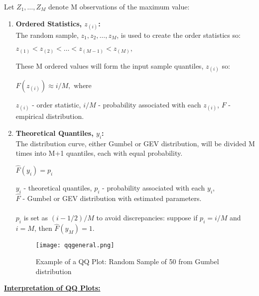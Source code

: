 \documentclass{article}
\begin{document}
Let $Z_1,\ldots, Z_M$ denote M observations of the maximum value:\vspace{-0.2cm}
\begin{enumerate}
  \item \textbf{Ordered Statistics, $z_{(i)}$:} \\ The random sample, ${z_1, z_2,\ldots, z_M}$, is used to create the order statistics so: 
  \vspace*{-3mm}
  \begin{flushleft}
   $z_{(1)} < z_{(2)} <\ldots< z_{(M-1)} < z_{(M)},$ 
  \end{flushleft}
    \vspace*{-3mm}
   These M ordered values will form the input sample quantiles, $z_{(i)}$ so:
   \vspace*{-3mm}
   \begin{center}
   $F(z_{(i)}) \approx i/M, \text{ where}$
   \end{center}
   \vspace*{-3mm}
  $z_{(i)}$ - order statistic, 
  $i/M$ - probability associated with each $z_{(i)}$,
  $F$ - empirical distribution.

  \item \textbf{Theoretical Quantiles, $y_i$:} \\ The distribution curve, either Gumbel or GEV distribution, will be divided M times into M+1 quantiles, each with equal probability.
  \vspace*{-3mm}
  \begin{center}
  $\hat{F}$$(y_i) = p_i$ 
  \end{center} 
  \vspace*{-3mm}
  $y_i$ - theoretical quantiles, 
  $p_i$ - probability associated with each $y_i$, \\
  $\hat{F}$ - Gumbel or GEV distribution with estimated parameters. \\
 \\ $p_i$ is set as $(i-1/2)/M$ to avoid discrepancies: suppose if $p_i = i/M$ and $i = M$, then $\hat{F}$$(y_M) = 1$.
  
   \begin{figure}[h]
    \centering
    \texttt{[image: qqgeneral.png]}
  \vspace*{-5mm} 
  \caption{Example of a QQ Plot: Random Sample of 50 from Gumbel distribution}
  \label{qqplotexample}
  \end{figure}
\end{enumerate}  

\underline{\textbf{Interpretation of QQ Plots:}}
\end{document}
